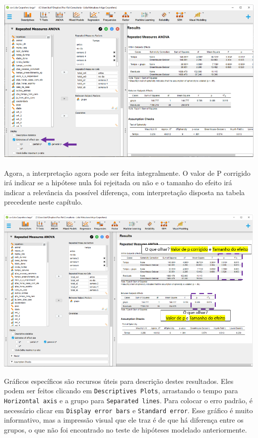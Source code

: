 \documentclass[
]{book}
\begin{document}
\includegraphics{./img/cap_anovarm_tamanho_do_efeito.png}

Agora, a interpretação agora pode ser feita integralmente. O valor de P
corrigido irá indicar se a hipótese nula foi rejeitada ou não e o
tamanho do efeito irá indicar a relevância da possível diferença, com
interpretação disposta na tabela precedente neste capítulo.

\includegraphics{./img/cap_anovarm_interpretacao.png}

Gráficos específicos são recursos úteis para descrição destes
resultados. Eles podem ser feitos clicando em
\texttt{Descriptives\ Plots}, arrastando o tempo para
\texttt{Horizontal\ axis} e a grupo para \texttt{Separated\ lines}. Para
colocar o erro padrão, é necessário clicar em
\texttt{Display\ error\ bars} e \texttt{Standard\ error}. Esse gráfico é
muito informativo, mas a impressão visual que ele traz é de que há
diferença entre os grupos, o que não foi encontrado no teste de
hipóteses modelado anteriormente.
\end{document}
